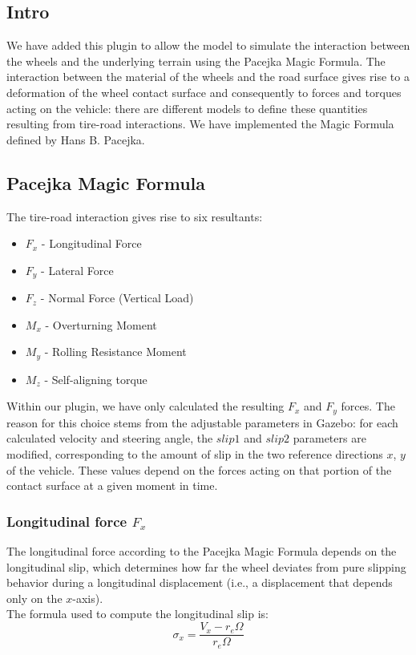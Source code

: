 \subsection{Intro}

We have added this plugin to allow the model to simulate the interaction between the wheels and the underlying terrain using the Pacejka Magic Formula.
The interaction between the material of the wheels and the road surface gives rise to a deformation of the wheel contact surface and consequently to forces and torques acting on the vehicle: there are different models to define these quantities resulting from tire-road interactions. We have implemented the Magic Formula defined by Hans B. Pacejka.

\subsection{Pacejka Magic Formula}
The tire-road interaction gives rise to six resultants:
\begin{itemize}
	\item $F_x$ - Longitudinal Force
	\item $F_y$ - Lateral Force
	\item $F_z$ - Normal Force (Vertical Load)
	\item $M_x$ - Overturning Moment
	\item $M_y$ - Rolling Resistance Moment
	\item $M_z$ - Self-aligning torque
\end{itemize}
Within our plugin, we have only calculated the resulting $F_x$ and $F_y$ forces. The reason for this choice stems from the adjustable parameters in Gazebo: for each calculated velocity and steering angle, the $slip1$ and $slip2$ parameters are modified, corresponding to the amount of slip in the two reference directions $x$, $y$ of the vehicle. These values depend on the forces acting on that portion of the contact surface at a given moment in time.

\subsubsection{Longitudinal force $F_x$}
The longitudinal force according to the Pacejka Magic Formula depends on the longitudinal slip, which determines how far the wheel deviates from pure slipping behavior during a longitudinal displacement (i.e., a displacement that depends only on the $x$-axis).
\\
The formula used to compute the longitudinal slip is:
\[
\sigma_x =
	\frac{V_x - r_e\Omega}{r_e\Omega}
\] \\


